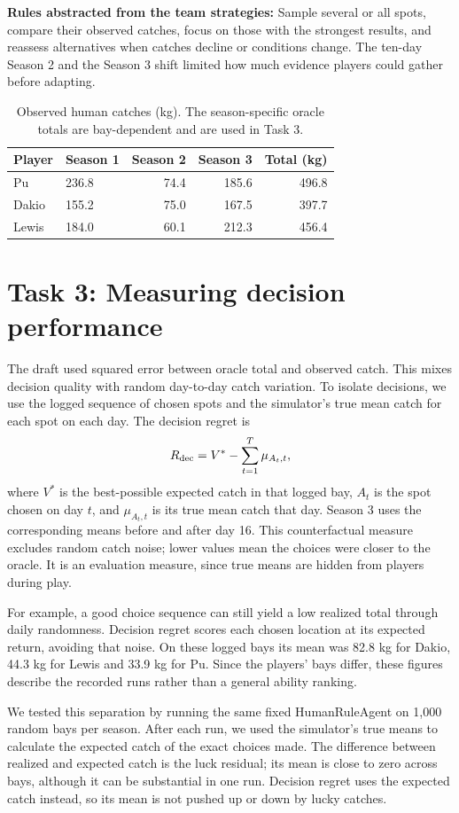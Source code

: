 \documentclass[11pt,a4paper]{article}
\begin{document}
\noindent\textbf{Rules abstracted from the team strategies:} Sample several or all spots, compare their observed catches, focus on those with the strongest results, and reassess alternatives when catches decline or conditions change. The ten-day Season 2 and the Season 3 shift limited how much evidence players could gather before adapting.

\begin{table}[H]\centering\small
\begin{tabular}{llrrr}\toprule
Player & Season 1 & Season 2 & Season 3 & Total (kg)\\\midrule
Pu & 236.8 & 74.4 & 185.6 & 496.8\\
Dakio & 155.2 & 75.0 & 167.5 & 397.7\\
Lewis & 184.0 & 60.1 & 212.3 & 456.4\\\bottomrule
\end{tabular}
\caption{Observed human catches (kg). The season-specific oracle totals are bay-dependent and are used in Task 3.}
\end{table}

\section{Task 3: Measuring decision performance}
The draft used squared error between oracle total and observed catch. This mixes decision quality with random day-to-day catch variation. To isolate decisions, we use the logged sequence of chosen spots and the simulator's true mean catch for each spot on each day. The decision regret is
\[
R_{\rm dec} = V^* - \sum_{t=1}^{T}\mu_{A_t,t},
\]
where $V^*$ is the best-possible expected catch in that logged bay, $A_t$ is the spot chosen on day $t$, and $\mu_{A_t,t}$ is its true mean catch that day. Season 3 uses the corresponding means before and after day 16. This counterfactual measure excludes random catch noise; lower values mean the choices were closer to the oracle. It is an evaluation measure, since true means are hidden from players during play.

For example, a good choice sequence can still yield a low realized total through daily randomness. Decision regret scores each chosen location at its expected return, avoiding that noise. On these logged bays its mean was 82.8 kg for Dakio, 44.3 kg for Lewis and 33.9 kg for Pu. Since the players' bays differ, these figures describe the recorded runs rather than a general ability ranking.

We tested this separation by running the same fixed HumanRuleAgent on 1,000 random bays per season. After each run, we used the simulator's true means to calculate the expected catch of the exact choices made. The difference between realized and expected catch is the luck residual; its mean is close to zero across bays, although it can be substantial in one run. Decision regret uses the expected catch instead, so its mean is not pushed up or down by lucky catches.
\end{document}
